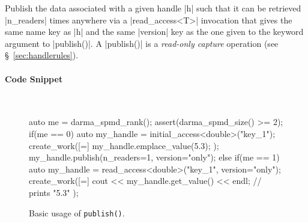 Publish the data associated with a given handle |h| such that it can be
retrieved |n_readers| times anywhere via a |read_access<T>| invocation
that gives the same name key as |h| and the same |version| key as
the one given to the keyword argument to |publish()|.
A |publish()| is a {\it read-only capture} operation (see
\S~\ref{sec:handlerules}).

\paragraph{Code Snippet} \mbox{}\\
\begin{figure}[!h]
\begin{CppCodeNumb}
auto me = darma_spmd_rank();
assert(darma_spmd_size() >= 2);
if(me == 0) {
  auto my_handle = initial_access<double>("key_1");
  create_work([=]{
    my_handle.emplace_value(5.3);
  });
  my_handle.publish(n_readers=1, version="only");
}
else if(me == 1) {
  auto my_handle = read_access<double>("key_1", version="only");
  create_work([=]{
    cout << my_handle.get_value() << endl; // prints "5.3"
  });
}
\end{CppCodeNumb}
\label{fig:fe_api_publish}
\caption{Basic usage of \lstinline|publish()|.}
\end{figure}

